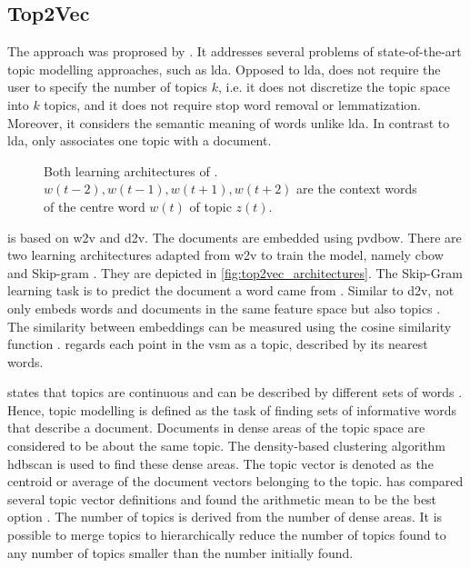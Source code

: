 \subsection{Top2Vec}\label{subsec:top2vec}

The approach \topTwovec{} was proprosed by \citeauthor{Top2Vec2020} \cite{Top2Vec2020}.
It addresses several problems of state-of-the-art topic modelling approaches, such as \ac{lda}.
Opposed to \ac{lda}, \topTwovec{} does not require the user to specify the number of topics $k$, 
i.e. it does not discretize the topic space into $k$ topics, 
and it does not require stop word removal or lemmatization.
Moreover, it considers the semantic meaning of words unlike \ac{lda}.
In contrast to \ac{lda}, \topTwovec{} only associates one topic with a document.

\begin{figure}%
    \centering
    \qquad
    \caption{Both learning architectures of \topTwovec{}.
    $w(t-2), w(t-1), w(t+1), w(t+2)$ are the context words of the centre word $w(t)$ of topic $z(t)$.
    }%
    \label{fig:top2vec_architectures}%
\end{figure}

\topTwovec{} is based on \ac{w2v} and \ac{d2v}.
The documents are embedded using \ac{pvdbow}.
There are two learning architectures adapted from \ac{w2v} to train the model, namely \ac{cbow} and Skip-gram \cite{Topic2Vec2015}.
They are depicted in \autoref{fig:top2vec_architectures}.
The Skip-Gram learning task is to predict the document a word came from \cite{Top2Vec2020, Topic2Vec2015}.
Similar to \ac{d2v}, \topTwovec{} not only embeds words and documents in the same feature space but also topics \cite{Top2Vec2020, Topic2Vec2015}.
The similarity between embeddings can be measured using the cosine similarity function \cite{Topic2Vec2015}.
\citeauthor{Top2Vec2020} regards each point in the \ac{vsm} as a topic, described by its nearest words.

\citeauthor{Top2Vec2020} states that topics are continuous and can be described by different sets of words \cite{Top2Vec2020}.
Hence, topic modelling is defined as the task of finding sets of informative words that describe a document.
Documents in dense areas of the topic space are considered to be about the same topic.
The density-based clustering algorithm \ac{hdbscan} is used to find these dense areas.
The topic vector is denoted as the centroid or average of the document vectors belonging to the topic.
\citeauthor{Top2Vec2020} has compared several topic vector definitions and found the arithmetic mean to be the best option \cite{Top2Vec2020}.
The number of topics is derived from the number of dense areas.
It is possible to merge topics to hierarchically reduce the number of topics found to any number of topics smaller than the number initially found.

